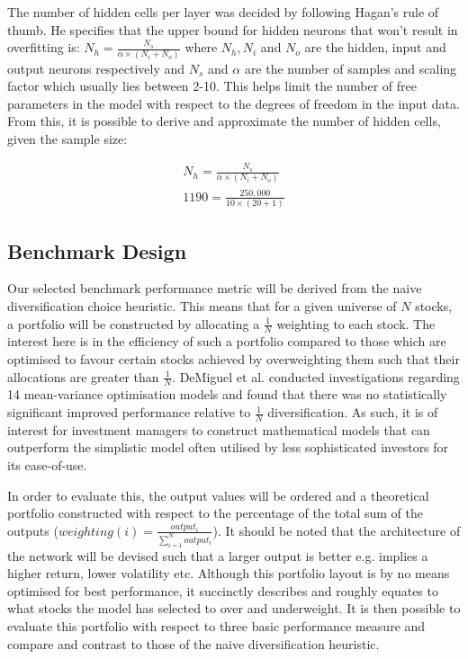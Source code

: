 \documentclass[10pt,onecolumn,letterpaper]{article}
\begin{document}
The number of hidden cells per layer was decided by following Hagan's rule of thumb\cite{Hagan}. He specifies that the upper bound for hidden neurons that won't result in overfitting is: $N_{h} = \frac{N_{s}}{\alpha \times (N_{i}+N_{o})}$ where $N_{h}, N_{i}$ and $N_{o}$ are the hidden, input and output neurons respectively and $N_{s}$ and $\alpha$ are the number of samples and scaling factor which usually lies between 2-10. This helps limit the number of free parameters in the model with respect to the degrees of freedom in the input data. From this, it is possible to derive and approximate the number of hidden cells, given the sample size: 

\vskip -0.5cm
\begin{gather*}
 	N_{h} = \frac{N_{s}}{\alpha \times (N_{i}+N_{o})} \\
	1190 = \frac{250,000}{10 \times (20+1)}
\end{gather*}


\subsection{Benchmark Design} \label{benchmark}

Our selected benchmark performance metric will be derived from the naive diversification choice heuristic. This means that for a given universe of $N$ stocks, a portfolio will be constructed by allocating a $\frac{1}{N}$ weighting to each stock. The interest here is in the efficiency of such a portfolio compared to those which are optimised to favour certain stocks achieved by overweighting them such that their allocations are greater than $\frac{1}{N}$. DeMiguel et al. conducted investigations\cite{DeMiguel} regarding 14 mean-variance optimisation models and found that there was no statistically significant improved performance relative to $\frac{1}{N}$ diversification. As such, it is of interest for investment managers to construct mathematical models that can outperform the simplistic model often utilised by less sophisticated investors for its ease-of-use. 

In order to evaluate this, the output values will be ordered and a theoretical portfolio constructed with respect to the percentage of the total sum of the outputs ($weighting(i) = \frac{output_{i} }{\sum_{i=1}^{N} output_{i}}$). It should be noted that the architecture of the network will be devised such that a larger output is better e.g. implies a higher return, lower volatility etc. Although this portfolio layout is by no means optimised for best performance, it succinctly describes and roughly equates to what stocks the model has selected to over and underweight. It is then possible to evaluate this portfolio with respect to three basic performance measure and compare and contrast to those of the naive diversification heuristic. 
\end{document}
